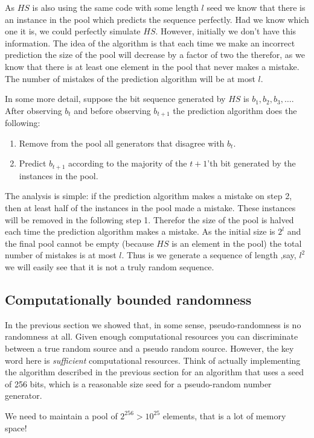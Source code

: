 As $HS$ is also using the same code with some length $l$ seed we know
that there is an instance in the pool which predicts the sequence
perfectly. Had we know which one it is, we could perfectly simulate
$HS$. However, initially we don't have this information. The idea of
the algorithm is that each time we make an incorrect prediction the
size of the pool will decrease by a factor of two the therefor, as we
know that there is at least one element in the pool that never makes a
mistake. The number of mistakes of the prediction algorithm will be at
most $l$.

In some more detail, suppose the bit sequence generated by $HS$ is
$b_1,b_2,b_3,\ldots$. After observing $b_t$ and before observing
$b_{t+1}$ the prediction algorithm does the following:

\begin{enumerate}
\item Remove from the pool all generators that disagree with $b_t$.
\item Predict $b_{t+1}$ according to the majority of the $t+1$'th bit
  generated by the instances in the pool.
\end{enumerate}

The analysis is simple: if the prediction algorithm makes a mistake on
step 2, then at least half of the instances in the pool made a
mistake. These instances will be removed in the following step
1. Therefor the size of the pool is halved each time the prediction
algorithm makes a mistake. As the initial size is $2^l$ and the final
pool cannot be empty (because $HS$ is an element in the pool) the
total number of mistakes is at most $l$. Thus is we generate a
sequence of length ,say, $l^2$ we will easily see that it is not a
truly random sequence.

\subsection{Computationally bounded randomness}
In the previous section we showed that, in some sense,
pseudo-randomness is no randomness at all. Given enough computational
resources you can discriminate between a true random source and a
pseudo random source. However, the key word here is {\em sufficient}
computational resources. Think of actually implementing the algorithm
described in the previous section for an algorithm that uses a seed of
256 bits, which is a reasonable size seed for a pseudo-random number generator.

We need to maintain a pool of $2^{256} > 10^{25}$ elements, that is a
lot of memory space!

